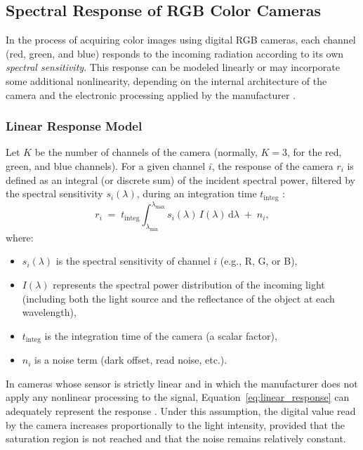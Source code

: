 \subsection{Spectral Response of RGB Color Cameras}

In the process of acquiring color images using digital RGB cameras, each channel (red, green, and blue) responds to the incoming radiation according to its own \emph{spectral sensitivity}. This response can be modeled linearly or may incorporate some additional nonlinearity, depending on the internal architecture of the camera and the electronic processing applied by the manufacturer \cite{Vora1997DigitalModels,Cheung2004AccurateCameras,Uttner2006SpectralCameras}.

\subsubsection{Linear Response Model}

Let $K$ be the number of channels of the camera (normally, $K=3$, for the red, green, and blue channels). For a given channel $i$, the response of the camera $r_{i}$ is defined as an integral (or discrete sum) of the incident spectral power, filtered by the spectral sensitivity $s_{i}(\lambda)$, during an integration time $t_{\mathrm{integ}}$ \cite{Vora1997DigitalModels,Uttner2006SpectralCameras}:
\begin{equation}
r_{i} \;=\; t_{\mathrm{integ}} \int_{\lambda_{\min}}^{\lambda_{\max}} s_{i}(\lambda)\,I(\lambda)\,\mathrm{d}\lambda \;+\; n_{i},
\label{eq:linear_response}
\end{equation}
where:
\begin{itemize}
    \item $s_{i}(\lambda)$ is the spectral sensitivity of channel $i$ (e.g., R, G, or B),
    \item $I(\lambda)$ represents the spectral power distribution of the incoming light (including both the light source and the reflectance of the object at each wavelength),
    \item $t_{\mathrm{integ}}$ is the integration time of the camera (a scalar factor),
    \item $n_{i}$ is a noise term (dark offset, read noise, etc.).
\end{itemize}

In cameras whose sensor is strictly linear and in which the manufacturer does not apply any nonlinear processing to the signal, Equation~\eqref{eq:linear_response} can adequately represent the response \cite{Vora1997DigitalModels}. Under this assumption, the digital value read by the camera increases proportionally to the light intensity, provided that the saturation region is not reached and that the noise remains relatively constant.

